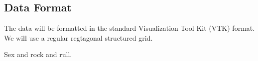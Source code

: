 



\subsection{Data Format}
The data will be formatted in the standard Visualization Tool Kit (VTK) format. We will use a regular regtagonal structured grid.


Sex and rock and rull.
